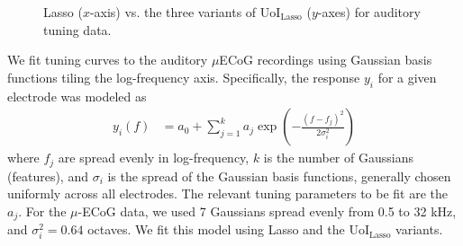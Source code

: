 \documentclass[11pt]{article}
\begin{document}
\begin{figure}
	\vspace{-40pt}
	\centering
	\caption{Lasso ($x$-axis) vs. the three variants of UoI$_{\text{Lasso}}$ ($y$-axes) for auditory tuning data.}
	\label{fig:ecog_tuning_scores}
	\vspace{-30pt}
\end{figure}
We fit tuning curves to the auditory $\mu$ECoG recordings using Gaussian basis functions tiling the log-frequency axis. Specifically, the response $y_i$ for a given electrode was modeled as
\begin{align}
y_i(f) &= a_0 + \sum_{j=1}^k a_j \exp\left(-\frac{(f - f_j)^2}{2\sigma_i^2}\right)
\end{align}
where $f_j$ are spread evenly in log-frequency, $k$ is the number of Gaussians (features), and $\sigma_i$ is the spread of the Gaussian basis functions, generally chosen uniformly across all electrodes. The relevant tuning parameters to be fit are the $a_j$. For the $\mu$-ECoG data, we used 7 Gaussians spread evenly from  0.5 to 32 kHz, and $\sigma_i^2=0.64$ octaves. We fit this model using Lasso and the UoI$_{\text{Lasso}}$ variants.
\end{document}

